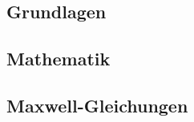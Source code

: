 	\begin{multicols}{3}
		\begin{minipage}{.3\paperheight}
			\maketitle
			\tableofcontents
		\end{minipage}
		\section{Grundlagen}
		\subsection{Mathematik}
	 \subsection{Maxwell-Gleichungen}

\end{multicols}

